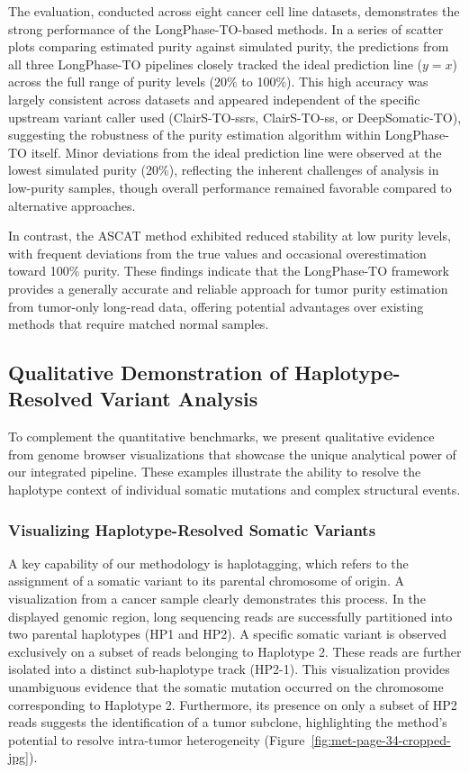 \documentclass[pdflatex,sn-nature]{sn-jnl}
\begin{document}
The evaluation, conducted across eight cancer cell line datasets, demonstrates the strong performance of the LongPhase-TO-based methods. In a series of scatter plots comparing estimated purity against simulated purity, the predictions from all three LongPhase-TO pipelines closely tracked the ideal prediction line ($y=x$) across the full range of purity levels (20\% to 100\%). This high accuracy was largely consistent across datasets and appeared independent of the specific upstream variant caller used (ClairS-TO-ssrs, ClairS-TO-ss, or DeepSomatic-TO), suggesting the robustness of the purity estimation algorithm within LongPhase-TO itself. Minor deviations from the ideal prediction line were observed at the lowest simulated purity (20\%), reflecting the inherent challenges of analysis in low-purity samples, though overall performance remained favorable compared to alternative approaches.

In contrast, the ASCAT method exhibited reduced stability at low purity levels, with frequent deviations from the true values and occasional overestimation toward 100\% purity. These findings indicate that the LongPhase-TO framework provides a generally accurate and reliable approach for tumor purity estimation from tumor-only long-read data, offering potential advantages over existing methods that require matched normal samples.

\subsection{Qualitative Demonstration of Haplotype-Resolved Variant Analysis}\label{qualitative-demonstration-of-haplotype-resolved-variant-analysis}

To complement the quantitative benchmarks, we present qualitative evidence from genome browser visualizations that showcase the unique analytical power of our integrated pipeline. These examples illustrate the ability to resolve the haplotype context of individual somatic mutations and complex structural events.

\subsubsection{Visualizing Haplotype-Resolved Somatic Variants}\label{visualizing-haplotype-resolved-somatic-variants}

A key capability of our methodology is haplotagging, which refers to the assignment of a somatic variant to its parental chromosome of origin. A visualization from a cancer sample clearly demonstrates this process. In the displayed genomic region, long sequencing reads are successfully partitioned into two parental haplotypes (HP1 and HP2). A specific somatic variant is observed exclusively on a subset of reads belonging to Haplotype 2. These reads are further isolated into a distinct sub-haplotype track (HP2-1). This visualization provides unambiguous evidence that the somatic mutation occurred on the chromosome corresponding to Haplotype 2. Furthermore, its presence on only a subset of HP2 reads suggests the identification of a tumor subclone, highlighting the method's potential to resolve intra-tumor heterogeneity (Figure~\ref{fig:met-page-34-cropped-jpg}).
\end{document}
